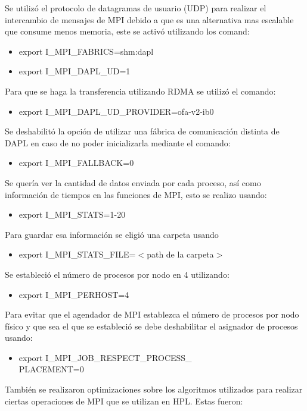 Se utilizó el protocolo de datagramas de usuario (UDP) para realizar el intercambio de mensajes de MPI debido a que es una alternativa mas escalable que consume menos memoria, este se activó utilizando los comand:\cite{hpl_params_intel}
\begin{itemize}
    \item export I\_MPI\_FABRICS=shm:dapl
    \item export I\_MPI\_DAPL\_UD=1
\end{itemize}
Para que se haga la transferencia utilizando RDMA se utilizó el comando:
\begin{itemize}
    \item export I\_MPI\_DAPL\_UD\_PROVIDER=ofa-v2-ib0
\end{itemize}
Se deshabilitó la opción de utilizar una fábrica de comunicación distinta de DAPL en caso de no poder inicializarla mediante el comando:
\begin{itemize}
    \item export I\_MPI\_FALLBACK=0
\end{itemize}
Se quería ver la cantidad de datos enviada por cada proceso, así como información de tiempos en las funciones de MPI, esto se realizo usando:
\begin{itemize}
    \item export I\_MPI\_STATS=1-20
\end{itemize}
Para guardar esa información se eligió una carpeta usando
\begin{itemize}
    \item export I\_MPI\_STATS\_FILE=$<$path de la carpeta$>$
\end{itemize}
Se estableció el número de procesos por nodo en 4 utilizando:
\begin{itemize}
    \item export I\_MPI\_PERHOST=4
\end{itemize}
Para evitar que el agendador de MPI establezca el número de procesos por nodo físico y que sea el que se estableció se debe deshabilitar el asignador de procesos usando:
\begin{itemize}
    \item export I\_MPI\_JOB\_RESPECT\_PROCESS\_\\PLACEMENT=0
\end{itemize}
También se realizaron optimizaciones sobre los algoritmos utilizados para realizar ciertas operaciones de MPI que se utilizan en HPL. Estas fueron:
